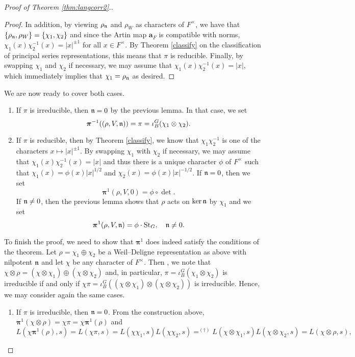 \begin{proof}[Proof of Theorem \ref{thm:langcorr2}.]
\begin{proof}
        In addition, by viewing $\rho_{\mathfrak{n}}$ and $\rho_W$ as characters of $F^\times$, we have that $\{\rho_{\mathfrak{n}},\rho_W\}=\{\chi_1,\chi_2\}$ and since the Artin map $\bm{a}_F$ is compatible with norms, $\chi_1(x)\chi_2^{-1}(x)=|x|^{\pm1}$ for all $x\in F^\times$. By Theorem \ref{classify} on the classification of principal series representations, this means that $\pi$ is reducible. Finally, by swapping $\chi_1$ and $\chi_2$ if necessary, we may assume that $\chi_1(x)\chi_2^{-1}(x)=|x|$, which immediately implies that $\chi_1=\rho_{\mathfrak{n}}$ as desired.
    \end{proof}
    We are now ready to cover both cases.
    \begin{enumerate}[(1)]
        \item If $\pi$ is irreducible, then $\mathfrak{n}=0$ by the previous lemma. In that case, we set 
        $$\bm\pi^{-1}((\rho,V,\mathfrak{n}))=\pi=\iota_B^G(\chi_1\otimes\chi_2).$$
        \item If $\pi$ is reducible, then by Theorem \ref{classify}, we know that $\chi_1\chi_2^{-1}$ is one of the characters $x\mapsto|x|^{\pm1}$. By swapping $\chi_1$ with $\chi_2$ if necessary, we may assume that $\chi_1(x)\chi_2^{-1}(x)=|x|$ and thus there is a unique character $\phi$ of $F^\times$ such that $\chi_1(x)=\phi(x)|x|^{1/2}$ and $\chi_2(x)=\phi(x)|x|^{-1/2}$. If $\mathfrak{n}=0$, then we set 
        $$\bm\pi^1(\rho,V,0)=\phi\circ\det.$$
        If $\mathfrak{n}\neq0$, then the previous lemma shows that $\rho$ acts on $\ker\mathfrak{n}$ by $\chi_1$ and we set 
        $$\bm\pi^1(\rho,V,\mathfrak{n})=\phi\cdot\mathrm{St}_G,\quad \mathfrak{n}\neq0.$$
    \end{enumerate}
    To finish the proof, we need to show that $\bm\pi^1$ does indeed satisfy the conditions of the theorem. Let $\rho=\chi_1\oplus\chi_2$ be a Weil--Deligne representation as above with nilpotent $\mathfrak{n}$ and let $\chi$ be any character of $F^\times$. Then , we note that $\chi\otimes\rho=(\chi\otimes\chi_1)\oplus(\chi\otimes\chi_2)$ and, in particular, $\pi=\iota_B^G(\chi_1\otimes\chi_2)$ is irreducible if and only if $\chi\pi=\iota_B^G((\chi\otimes\chi_1)\otimes(\chi\otimes\chi_2))$ is irreducible. Hence, we may consider again the same cases.
    \begin{enumerate}[(1)]
        \item If $\pi$ is irreducible, then $\mathfrak{n}=0$. From the construction above, $\bm\pi^1(\chi\otimes\rho)=\chi\pi=\chi\bm\pi^1(\rho)$ and
        $$L(\chi\bm\pi^1(\rho),s)=L(\chi\pi,s)=L(\chi\chi_1,s)L(\chi\chi_2,s)=^{(\dagger)}L(\chi\otimes\chi_1,s)L(\chi\otimes\chi_2,s)=L(\chi\otimes\rho,s),$$

\end{enumerate}
\end{proof}
